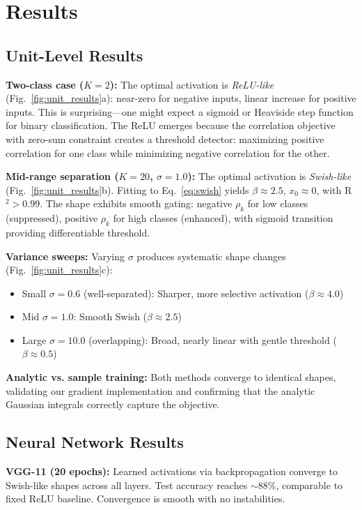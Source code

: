 \documentclass{article}
\begin{document}
\section{Results}
\label{sec:results}

\subsection{Unit-Level Results}

\textbf{Two-class case ($K=2$):} The optimal activation is \textit{ReLU-like} (Fig.~\ref{fig:unit_results}a): near-zero for negative inputs, linear increase for positive inputs. This is surprising—one might expect a sigmoid or Heaviside step function for binary classification. The ReLU emerges because the correlation objective with zero-sum constraint creates a threshold detector: maximizing positive correlation for one class while minimizing negative correlation for the other.

\textbf{Mid-range separation ($K=20$, $\sigma=1.0$):} The optimal activation is \textit{Swish-like} (Fig.~\ref{fig:unit_results}b). Fitting to Eq.~\ref{eq:swish} yields $\beta \approx 2.5$, $x_0 \approx 0$, with R$^2 > 0.99$. The shape exhibits smooth gating: negative $\rho_k$ for low classes (suppressed), positive $\rho_k$ for high classes (enhanced), with sigmoid transition providing differentiable threshold.

\textbf{Variance sweeps:} Varying $\sigma$ produces systematic shape changes (Fig.~\ref{fig:unit_results}c):
\begin{itemize}
\item Small $\sigma = 0.6$ (well-separated): Sharper, more selective activation ($\beta \approx 4.0$)
\item Mid $\sigma = 1.0$: Smooth Swish ($\beta \approx 2.5$)
\item Large $\sigma = 10.0$ (overlapping): Broad, nearly linear with gentle threshold ($\beta \approx 0.5$)
\end{itemize}

\textbf{Analytic vs. sample training:} Both methods converge to identical shapes, validating our gradient implementation and confirming that the analytic Gaussian integrals correctly capture the objective.

\subsection{Neural Network Results}

\textbf{VGG-11 (20 epochs):} Learned activations via backpropagation converge to Swish-like shapes across all layers. Test accuracy reaches $\sim 88\%$, comparable to fixed ReLU baseline. Convergence is smooth with no instabilities.
\end{document}
